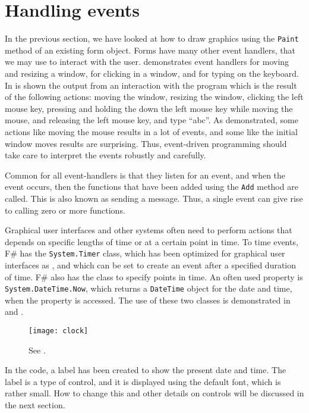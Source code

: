 \section{Handling events}
In the previous section, we have looked at how to draw graphics using the \lstinline!Paint! method of an existing form object. Forms have many other event handlers, that we may use to interact with the user.  demonstrates event handlers for moving and resizing a window, for clicking in a window, and for typing on the keyboard. 
%
%
%
In  is shown the output from an interaction with the program which is the result of the following actions: moving the window, resizing the window, clicking the left mouse key, pressing and holding the down the left mouse key while moving the mouse, and releasing the left mouse key, and type ``abc''. As demonstrated, some actions like moving the mouse results in a lot of events, and some like the initial window moves results are surprising. Thus, event-driven programming should take care to interpret the events robustly and carefully.

Common for all event-handlers is that they listen for an event, and when the event occurs, then the functions that have been added using the \lstinline{Add} method are called. This is also known as sending a message. Thus, a single event can give rise to calling zero or more functions.

Graphical user interfaces and other systems often need to perform actions that depends on specific lengths of time or at a certain point in time. To time events, F\# has the \lstinline{System.Timer} class, which has been optimized for graphical user interfaces as , and which can be set to create an event after a specified duration of time. F\# also has the  class to specify points in time. An often used property is \lstinline{System.DateTime.Now}, which returns a \lstinline{DateTime} object for the date and time, when the property is accessed. The use of these two classes is demonstrated in  and .
%
%
\begin{figure}
  \centering
  \texttt{[image: clock]}
  \caption{See .}
  \label{fig:clock}
\end{figure}
In the code, a label has been created to show the present date and time. The label is a type of control, and it is displayed using the default font, which is rather small. How to change this and other details on controls will be discussed in the next section.

